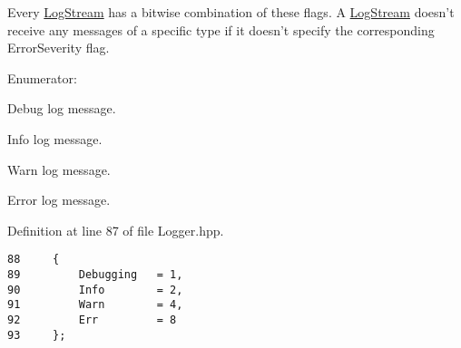 Every \hyperlink{class_assimp_1_1_log_stream}{LogStream} has a bitwise combination of these flags. A \hyperlink{class_assimp_1_1_log_stream}{LogStream} doesn't receive any messages of a specific type if it doesn't specify the corresponding ErrorSeverity flag. \begin{Desc}
\item[Enumerator: ]\par
\begin{description}
\item[{\em 
\hypertarget{class_assimp_1_1_logger_cd0b52a87d6fc11e957ed2c6e2ad75b60cb475014d27098c3423738c571d857f}{
Debugging}
\label{class_assimp_1_1_logger_cd0b52a87d6fc11e957ed2c6e2ad75b60cb475014d27098c3423738c571d857f}
}]Debug log message. \item[{\em 
\hypertarget{class_assimp_1_1_logger_cd0b52a87d6fc11e957ed2c6e2ad75b6a3377a574928b86f7de55c5df154f461}{
Info}
\label{class_assimp_1_1_logger_cd0b52a87d6fc11e957ed2c6e2ad75b6a3377a574928b86f7de55c5df154f461}
}]Info log message. \item[{\em 
\hypertarget{class_assimp_1_1_logger_cd0b52a87d6fc11e957ed2c6e2ad75b61279c77aaee5a3d7df835a9b9305a697}{
Warn}
\label{class_assimp_1_1_logger_cd0b52a87d6fc11e957ed2c6e2ad75b61279c77aaee5a3d7df835a9b9305a697}
}]Warn log message. \item[{\em 
\hypertarget{class_assimp_1_1_logger_cd0b52a87d6fc11e957ed2c6e2ad75b671054d0b1323abcea46d050d69013d27}{
Err}
\label{class_assimp_1_1_logger_cd0b52a87d6fc11e957ed2c6e2ad75b671054d0b1323abcea46d050d69013d27}
}]Error log message. \end{description}
\end{Desc}



Definition at line 87 of file Logger.hpp.

\begin{Code}\begin{verbatim}88     {
89         Debugging   = 1,    
90         Info        = 2,    
91         Warn        = 4,    
92         Err         = 8     
93     };
\end{verbatim}
\end{Code}




